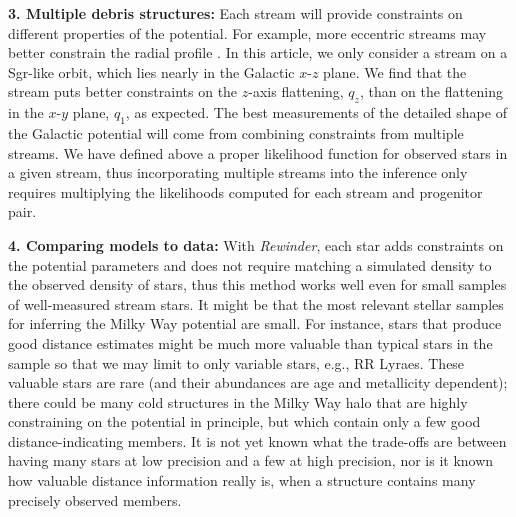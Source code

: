\documentclass[letterpaper,12pt,preprint]{aastex}
\newcommand{\rewinder}{\emph{Rewinder}}
\begin{document}
{\bf 3. Multiple debris structures:} Each stream will provide constraints on different properties of the potential. For example, more eccentric streams may better constrain the radial profile \citep[see][who illustrate the power of using multiple streams to simultaneously constrain the potential using orbit fitting]{deg14}. In this article, we only consider a stream on a Sgr-like orbit, which lies nearly in the Galactic $x$-$z$ plane. We find that the stream puts better constraints on the $z$-axis flattening, $q_z$, than on the flattening in the $x$-$y$ plane, $q_1$, as expected. The best measurements of the detailed shape of the Galactic potential will come from combining constraints from multiple streams. We have defined above a proper likelihood function for observed stars in a given stream, thus incorporating multiple streams into the inference only requires multiplying the likelihoods computed for each stream and progenitor pair.

{\bf 4. Comparing models to data:} With \rewinder, each star adds constraints on the potential parameters and does not require matching a simulated density to the observed density of stars, thus this method works well even for small samples of well-measured stream stars. It might be that the most relevant stellar samples for inferring the Milky Way potential are small. For instance, stars that produce good distance estimates might be much more valuable than typical stars in the sample so that we may limit to only variable stars, e.g., RR Lyraes. These valuable stars are rare (and their abundances are age and metallicity dependent); there could be many cold structures in the Milky Way halo that are highly constraining on the potential in principle, but which contain only a few good distance-indicating members. It is not yet known what the trade-offs are between having many stars at low precision and a few at high precision, nor is it known how valuable distance information really is, when a structure contains many precisely observed members.
\end{document}
